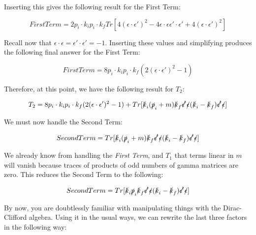 \documentclass[a4]{article}
\begin{document}
    Inserting this gives the following result for the First Term:

    \begin{equation}
        First Term = 2 p_i \cdot k_i p_i \cdot k_f Tr[ 4 (\epsilon \cdot \epsilon')^2 - 4 \epsilon \cdot \epsilon \epsilon' \cdot \epsilon' + 4 (\epsilon \cdot \epsilon')^2 ]
    \end{equation}

    Recall now that $\epsilon \cdot \epsilon = \epsilon' \cdot \epsilon' = -1$. Inserting these values and simplifying produces the following final answer for the First Term:

    \begin{framed}
        \begin{equation}
            First Term = 8 p_i \cdot k_i p_i \cdot k_f (2 (\epsilon \cdot \epsilon')^2 - 1)
        \end{equation}
    \end{framed}

    Therefore, at this point, we have the following result for $T_2$:

    \begin{equation}
        T_2 = 8 p_i \cdot k_i p_i \cdot k_f (2 (\epsilon \cdot \epsilon')^2 - 1) + Tr [\slashed{k}_i (\slashed{p}_i + m) \slashed{k}_f \slashed{\epsilon'} \slashed{\epsilon} (\slashed{k}_i - \slashed{k}_f) \slashed{\epsilon'} \slashed{\epsilon}]
    \end{equation}

    We must now handle the Second Term:

    \begin{equation}
        Second Term = Tr [\slashed{k}_i (\slashed{p}_i + m) \slashed{k}_f \slashed{\epsilon'} \slashed{\epsilon} (\slashed{k}_i - \slashed{k}_f) \slashed{\epsilon'} \slashed{\epsilon}]
    \end{equation}

    We already know from handling the \emph{First Term}, and $T_1$ that terms linear in $m$ will vanish because traces of products of odd numbers of gamma matrices are zero.
    This reduces the Second Term to the following:

    \begin{equation}
        Second Term = Tr [\slashed{k}_i \slashed{p}_i \slashed{k}_f \slashed{\epsilon'} \slashed{\epsilon} (\slashed{k}_i - \slashed{k}_f) \slashed{\epsilon'} \slashed{\epsilon}]
    \end{equation}

    By now, you are doubtlessly familiar with manipulating things with the Dirac-Clifford algebra. Using it in the usual ways, we can rewrite the last three factors in the
    following way:
\end{document}
